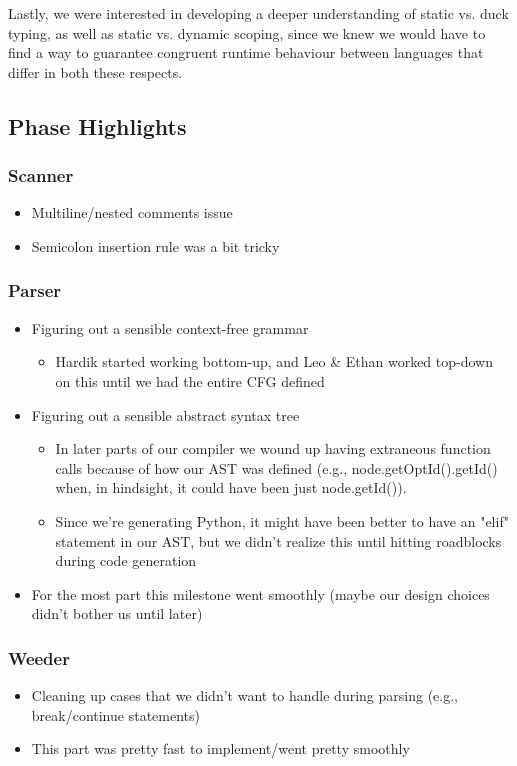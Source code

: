 \documentclass{article}
\begin{document}
Lastly, we were interested in developing a deeper understanding of static vs. duck typing, as well as static vs. dynamic scoping, since we knew we would have to find a way to guarantee congruent runtime behaviour between languages that differ in both these respects.
	
\subsection{Phase Highlights}

\subsubsection{Scanner}
\begin{itemize}
\item Multiline/nested comments issue
\item Semicolon insertion rule was a bit tricky
\end{itemize}
\subsubsection{Parser}
\begin{itemize}
\item Figuring out a sensible context-free grammar
\begin{itemize}
	\item Hardik started working bottom-up, and Leo \& Ethan worked top-down on this until we had the entire CFG defined
\end{itemize}
\item Figuring out a sensible abstract syntax tree
\begin{itemize}
	\item In later parts of our compiler we wound up having extraneous function calls because of how our AST was defined (e.g., node.getOptId().getId() when, in hindsight, it could have been just node.getId()).
	\item Since we're generating Python, it might have been better to have an "elif" statement in our AST, but we didn't realize this until hitting roadblocks during code generation
\end{itemize}
\item For the most part this milestone went smoothly (maybe our design choices didn't bother us until later)
\end{itemize}
\subsubsection{Weeder}
\begin{itemize}
\item Cleaning up cases that we didn't want to handle during parsing (e.g., break/continue statements)
\item This part was pretty fast to implement/went pretty smoothly
\end{itemize}
\end{document}
